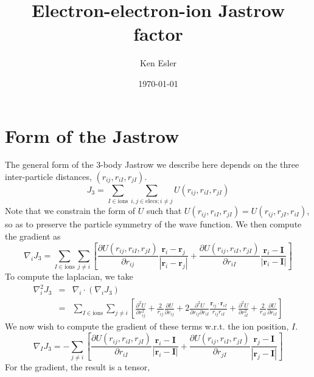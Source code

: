 \documentclass[letterpaper]{article}
\author{Ken Esler}
\title{Electron-electron-ion Jastrow factor}
\date{\today}
\begin{document}
\maketitle
\newcommand{\riI}{r_{iI}}
\newcommand{\briI}{\mathbf{r}_{iI}}
\newcommand{\rjI}{r_{jI}}
\newcommand{\brjI}{\mathbf{r}_{jI}}
\newcommand{\rij}{r_{ij}}
\newcommand{\brij}{\mathbf{r}_{ij}}
\section{Form of the Jastrow}
The general form of the 3-body Jastrow we describe here depends on the
three inter-particle distances, $(\rij, \riI, \rjI)$.
\begin{equation}
J_3 = \sum_{I\in\text{ions}} \sum_{i,j \in\text{elecs};i\neq j} U(\rij, \riI,
\rjI)
\end{equation}
Note that we constrain the form of $U$ such that
$U(\rij, \riI,\rjI) = U(\rij, \rjI,\riI)$, so as to preserve the
particle symmetry of the wave function.  We then compute the gradient as
\begin{equation}
\nabla_i J_3 =  \sum_{I\in\text{ions}} \sum_{j \neq i}
\left[\frac{\partial U(\rij, \riI,\rjI)}{\partial\rij}
  \frac{\mathbf{r}_i - \mathbf{r}_j}{|\mathbf{r}_i - \mathbf{r}_j|} 
+ \frac{\partial U(\rij, \riI,\rjI)}{\partial\riI}
  \frac{\mathbf{r}_i - \mathbf{I}}{|\mathbf{r}_i - \mathbf{I}|}  \right]
\end{equation}
To compute the laplacian, we take
\begin{eqnarray}
\nabla_i^2 J_3 & = & \nabla_i \cdot \left(\nabla_i J_3\right) \\
& = & \sum_{I\in\text{ions}} \sum_{j\neq i } \left[
\frac{\partial^2 U}{\partial \rij^2} + \frac{2}{\rij} \frac{\partial
  U}{\partial \rij} + 2 \frac{\partial^2 U}{\partial \rij \partial
  \riI}\frac{\brij\cdot\briI}{\rij\riI} +\frac{\partial^2 U}{\partial
  \riI^2}
+ \frac{2}{\riI}\frac{\partial U}{\partial \riI} \nonumber
\right]
\end{eqnarray}
We now wish to compute the gradient of these terms w.r.t. the ion position, $I$.
\begin{equation}
\nabla_I J_3 = -\sum_{j\neq i} \left[ \frac{\partial U(\rij, \riI,\rjI)}{\partial\riI}
  \frac{\mathbf{r}_i - \mathbf{I}}{|\mathbf{r}_i - \mathbf{I}|} 
+\frac{\partial U(\rij, \riI,\rjI)}{\partial\rjI}
  \frac{\mathbf{r}_j - \mathbf{I}}{|\mathbf{r}_j - \mathbf{I}|} \right]
\end{equation}
For the gradient, the result is a tensor,
\end{document}
